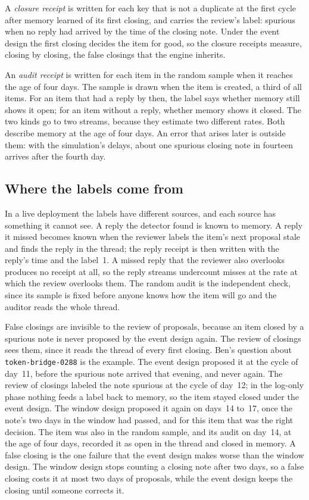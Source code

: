 \documentclass[11pt]{article}
\newcommand{\code}[1]{\texttt{#1}}
\theoremstyle{definition}
\theoremstyle{plain}
\begin{document}
A \emph{closure receipt} is written for each key that is not a duplicate at the first cycle after
memory learned of its first closing, and carries the review's label: spurious when no reply had
arrived by the time of the closing note. Under the event design the first closing decides the item
for good, so the closure receipts measure, closing by closing, the false closings that the engine
inherits.

An \emph{audit receipt} is written for each item in the random sample when it reaches the age of
four days. The sample is drawn when the item is created, a third of all items. For an item that had
a reply by then, the label says whether memory still shows it open; for an item without a reply,
whether memory shows it closed. The two kinds go to two streams, because they estimate two
different rates. Both describe memory at the age of four days. An error that arises later is outside
them: with the simulation's delays, about one spurious closing note in fourteen arrives after the
fourth day.

\subsection{Where the labels come from}\label{sec:labels}

In a live deployment the labels have different sources, and each source has something it cannot
see. A reply the detector found is known to memory. A reply it missed becomes known when the
reviewer labels the item's next proposal stale and finds the reply in the thread; the reply receipt
is then written with the reply's time and the label~1. A missed reply that the reviewer also
overlooks produces no receipt at all, so the reply streams undercount misses at the rate at which
the review overlooks them. The random audit is the independent check, since its sample is fixed
before anyone knows how the item will go and the auditor reads the whole thread.

False closings are invisible to the review of proposals, because an item closed by a spurious note
is never proposed by the event design again. The review of closings sees them, since it reads the
thread of every first closing. Ben's question about \code{token-bridge-0288} is the example. The
event design proposed it at the cycle of day~11, before the spurious note arrived that evening, and
never again. The review of closings labeled the note spurious at the cycle of day~12; in the
log-only phase nothing feeds a label back to memory, so the item stayed closed under the event
design.
The window design proposed it again on days~14 to~17, once the note's two days in the window had
passed, and for this item that was the right decision. The item was also in the random sample, and
its audit on day~14, at the age of four days, recorded it as open in the thread and closed in
memory. A false closing is the one failure that the event design makes worse than the window design.
The window design stops counting a closing note after two days, so a false closing costs it at most
two days of proposals, while the event design keeps the closing until someone corrects it.
\end{document}
